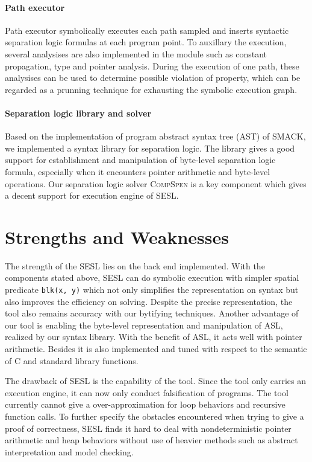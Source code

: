 \documentclass[runningheads]{llncs}
\begin{document}
\paragraph{Path executor} Path executor symbolically executes each path sampled and inserts  syntactic separation logic formulas at each program point. To auxillary the execution, several analysises are also implemented in the module such as constant propagation,  type and pointer analysis. During the execution of one path, these analysises can be used to determine possible violation of property, which can be regarded as a prunning technique for exhausting the symbolic execution graph.

\paragraph{Separation logic library and solver} Based on the implementation of program abstract syntax tree (AST) of \textsc{SMACK}, we implemented a syntax library for separation logic. The library gives a good support for establishment and manipulation of byte-level separation logic formula, especially when it encounters pointer arithmetic and byte-level operations. 
Our separation logic solver \textsc{CompSpen} is a key component which gives a decent support for execution engine of \textsc{SESL}. 


\section{Strengths and Weaknesses}

The strength of the \textsc{SESL} lies on the back end implemented. With the components stated above, \textsc{SESL} can do symbolic execution with simpler spatial predicate \texttt{blk(x, y)} which not only simplifies the representation on syntax but also improves the efficiency on solving. Despite the precise representation, the tool also  remains accuracy with our bytifying techniques. Another advantage of our tool is enabling the byte-level representation and manipulation of ASL, realized by our syntax library. With the benefit of ASL, it acts well with pointer arithmetic.
Besides  it is also implemented and tuned with respect to the semantic of C and standard library functions.

The drawback of \textsc{SESL} is the capability of the tool. Since the tool only carries an execution engine, it can now only conduct falsification of programs. The tool currently cannot give a over-approximation for loop behaviors and recursive function calls. To further specify the obstacles encountered when trying to give a proof of correctness, \textsc{SESL} finds it hard to deal with nondeterministic pointer arithmetic and heap behaviors without use of heavier methods such as abstract interpretation and model checking.
\end{document}
